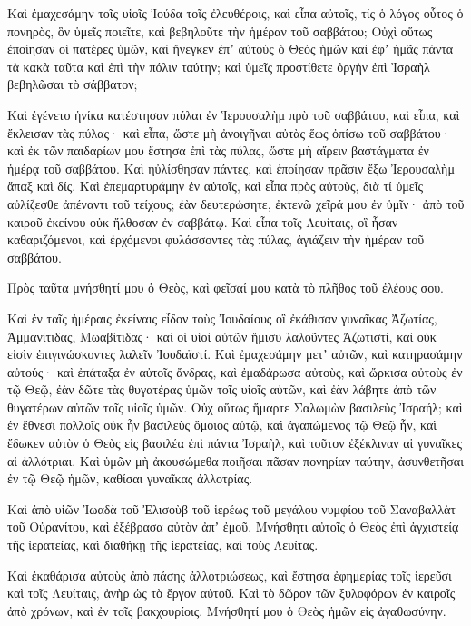{Καὶ ἐμαχεσάμην τοῖς υἱοῖς Ἰούδα τοῖς ἐλευθέροις, καὶ εἶπα αὐτοῖς, τίς ὁ λόγος οὗτος ὁ πονηρὸς, ὃν ὑμεῖς ποιεῖτε, καὶ βεβηλοῦτε τὴν ἡμέραν τοῦ σαββάτου;
Οὐχὶ οὕτως ἐποίησαν οἱ πατέρες ὑμῶν, καὶ ἤνεγκεν ἐπʼ αὐτοὺς ὁ Θεὸς ἡμῶν καὶ ἐφʼ ἡμᾶς πάντα τὰ κακὰ ταῦτα καὶ ἐπὶ τὴν πόλιν ταύτην; καὶ ὑμεῖς προστίθετε ὀργὴν ἐπὶ Ἰσραὴλ βεβηλῶσαι τὸ σάββατον;
\par }{\PP {}Καὶ ἐγένετο ἡνίκα κατέστησαν πύλαι ἐν Ἱερουσαλὴμ πρὸ τοῦ σαββάτου, καὶ εἶπα, καὶ ἔκλεισαν τὰς πύλας· καὶ εἶπα, ὥστε μὴ ἀνοιγῆναι αὐτὰς ἕως ὀπίσω τοῦ σαββάτου· καὶ ἐκ τῶν παιδαρίων μου ἔστησα ἐπὶ τὰς πύλας, ὥστε μὴ αἴρειν βαστάγματα ἐν ἡμέρᾳ τοῦ σαββάτου.
Καὶ ηὐλίσθησαν πάντες, καὶ ἐποίησαν πρᾶσιν ἔξω Ἰερουσαλὴμ ἅπαξ καὶ δίς.
Καὶ ἐπεμαρτυράμην ἐν αὐτοῖς, καὶ εἶπα πρὸς αὐτοὺς, διὰ τί ὑμεῖς αὐλίζεσθε ἀπέναντι τοῦ τείχους; ἐὰν δευτερώσητε, ἐκτενῶ χεῖρά μου ἐν ὑμῖν· ἀπὸ τοῦ καιροῦ ἐκείνου οὐκ ἤλθοσαν ἐν σαββάτῳ.
Καὶ εἶπα τοῖς Λευίταις, οἳ ἦσαν καθαριζόμενοι, καὶ ἐρχόμενοι φυλάσσοντες τὰς πύλας, ἁγιάζειν τὴν ἡμέραν τοῦ σαββάτου.
\par }{\PP Πρὸς ταῦτα μνήσθητί μου ὁ Θεὸς, καὶ φεῖσαί μου κατὰ τὸ πλῆθος τοῦ ἐλέους σου.
\par }{\PP {}Καὶ ἐν ταῖς ἡμέραις ἐκείναις εἶδον τοὺς Ἰουδαίους οἳ ἐκάθισαν γυναῖκας Ἀζωτίας, Ἀμμανίτιδας, Μωαβίτιδας·
καὶ οἱ υἱοὶ αὐτῶν ἥμισυ λαλοῦντες Ἀζωτιστὶ, καὶ οὐκ εἰσὶν ἐπιγινώσκοντες λαλεῖν Ἰουδαϊστί.
Καὶ ἐμαχεσάμην μετʼ αὐτῶν, καὶ κατηρασάμην αὐτούς· καὶ ἐπάταξα ἐν αὐτοῖς ἄνδρας, καὶ ἐμαδάρωσα αὐτοὺς, καὶ ὤρκισα αὐτοὺς ἐν τῷ Θεῷ, ἐὰν δῶτε τὰς θυγατέρας ὑμῶν τοῖς υἱοῖς αὐτῶν, καὶ ἐὰν λάβητε ἀπὸ τῶν θυγατέρων αὐτῶν τοῖς υἱοῖς ὑμῶν.
Οὐχ οὕτως ἥμαρτε Σαλωμὼν βασιλεὺς Ἰσραήλ; καὶ ἐν ἔθνεσι πολλοῖς οὐκ ἦν βασιλεὺς ὅμοιος αὐτῷ, καὶ ἀγαπώμενος τῷ Θεῷ ἦν, καὶ ἔδωκεν αὐτὸν ὁ Θεὸς εἰς βασιλέα ἐπὶ πάντα Ἰσραὴλ, καὶ τοῦτον ἐξέκλιναν αἱ γυναῖκες αἱ ἀλλότριαι.
Καὶ ὑμῶν μὴ ἀκουσώμεθα ποιῆσαι πᾶσαν πονηρίαν ταύτην, ἀσυνθετῆσαι ἐν τῷ Θεῷ ἡμῶν, καθίσαι γυναῖκας ἀλλοτρίας.
\par }{\PP {}Καὶ ἀπὸ υἱῶν Ἰωαδὰ τοῦ Ἐλισοὺβ τοῦ ἱερέως τοῦ μεγάλου νυμφίου τοῦ Σαναβαλλὰτ τοῦ Οὐρανίτου, καὶ ἐξέβρασα αὐτὸν ἀπʼ ἐμοῦ.
Μνήσθητι αὐτοῖς ὁ Θεὸς ἐπὶ ἀγχιστείᾳ τῆς ἱερατείας, καὶ διαθήκῃ τῆς ἱερατείας, καὶ τοὺς Λευίτας.
\par }{\PP {}Καὶ ἐκαθάρισα αὐτοὺς ἀπὸ πάσης ἀλλοτριώσεως, καὶ ἔστησα ἐφημερίας τοῖς ἱερεῦσι καὶ τοῖς Λευίταις, ἀνὴρ ὡς τὸ ἔργον αὐτοῦ.
Καὶ τὸ δῶρον τῶν ξυλοφόρων ἐν καιροῖς ἀπὸ χρόνων, καὶ ἐν τοῖς βακχουρίοις. Μνήσθητί μου ὁ Θεὸς ἡμῶν εἰς ἀγαθωσύνην.
\par }